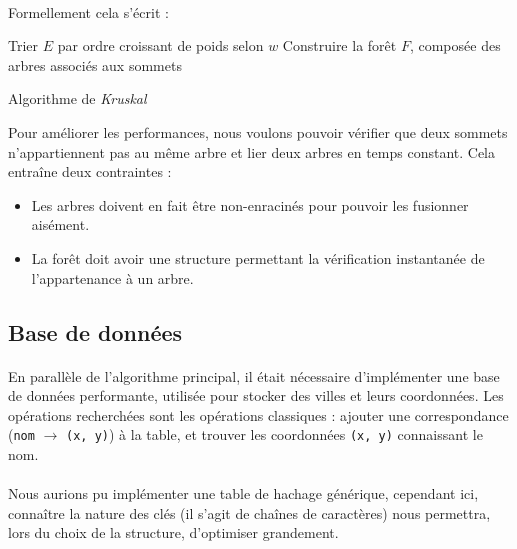 \documentclass[a4paper]{article}
\begin{document}
\paragraph*{}
Formellement cela s'écrit :

\medskip

\begin{algorithm}[H]
\SetAlgoLined
{}
Trier $E$ par ordre croissant de poids selon $w$\;
Construire la forêt $F$, composée des arbres associés aux sommets\;
\caption{Algorithme de \emph{Kruskal}}
\end{algorithm}

\medskip

Pour améliorer les performances, nous voulons pouvoir vérifier que deux sommets n'appartiennent pas au même arbre et lier deux arbres en temps constant. Cela entraîne deux contraintes :
\begin{itemize}
\item Les arbres doivent en fait être non-enracinés pour pouvoir les fusionner aisément.
\item La forêt doit avoir une structure permettant la vérification instantanée de l'appartenance à un arbre.
\end{itemize}

\subsection{Base de données}

\paragraph*{}
En parallèle de l'algorithme principal, il était nécessaire d'implémenter une base de données performante, utilisée pour stocker des villes et leurs coordonnées. Les opérations recherchées sont les opérations classiques : ajouter une correspondance (\texttt{nom} $\rightarrow$ \texttt{(x, y)}) à la table, et trouver les coordonnées \texttt{(x, y)} connaissant le nom.

\paragraph*{}
Nous aurions pu implémenter une table de hachage générique, cependant ici, connaître la nature des clés (il s'agit de chaînes de caractères) nous permettra, lors du choix de la structure, d'optimiser grandement.
\end{document}
